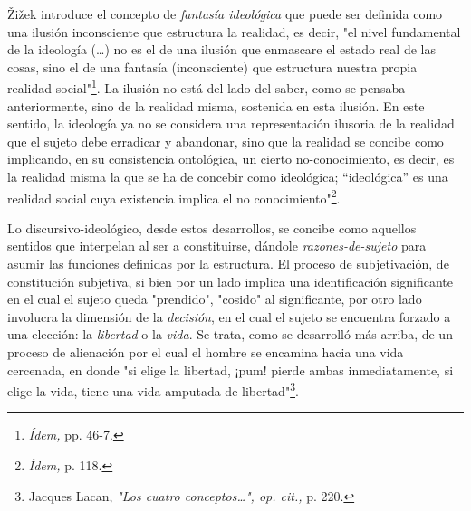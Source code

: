 \documentclass{book}
\begin{document}
Žižek introduce el concepto de \emph{fantasía ideológica} que puede ser
definida como una ilusión inconsciente que estructura la realidad, es
decir, "el nivel fundamental de la ideología (\dots) no es el de
una ilusión que enmascare el estado real de las cosas, sino el de una
fantasía (inconsciente) que estructura nuestra propia realidad
social"\footnote{\emph{Ídem,} pp. 46-7.}. La ilusión no está del lado
del saber, como se pensaba anteriormente, sino de la realidad misma,
sostenida en esta ilusión. En este sentido, la ideología ya no se
considera una representación ilusoria de la realidad que el sujeto debe
erradicar y abandonar, sino que la realidad se concibe como implicando,
en su consistencia ontológica, un cierto no-conocimiento, es decir, es
la realidad misma la que se ha de concebir como ideológica;
\enquote{ideológica} es una realidad social cuya existencia implica el no
conocimiento"\footnote{\emph{Ídem,} p. 118.}.

Lo discursivo-ideológico, desde estos desarrollos, se concibe como
aquellos sentidos que interpelan al ser a constituirse, dándole
\emph{razones-de-sujeto} para asumir las funciones definidas por la
estructura. El proceso de subjetivación, de constitución subjetiva, si
bien por un lado implica una identificación significante en el cual el
sujeto queda "prendido", "cosido" al significante, por otro lado
involucra la dimensión de la \emph{decisión}, en el cual el sujeto se
encuentra forzado a una elección: la \emph{libertad} o la \emph{vida}.
Se trata, como se desarrolló más arriba, de un proceso de alienación por
el cual el hombre se encamina hacia una vida cercenada, en donde "si
elige la libertad, ¡pum! pierde ambas inmediatamente, si elige la vida,
tiene una vida amputada de libertad"\footnote{Jacques Lacan, \emph{"Los
  cuatro conceptos\ldots", op. cit.,} p. 220.}.
\end{document}
